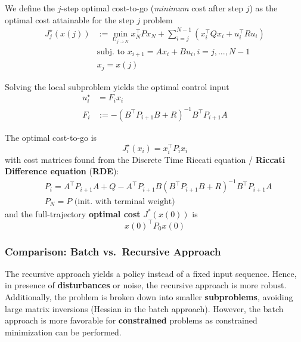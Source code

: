 We define the $j$-step optimal cost-to-go (\textit{minimum} cost after step $j$) as the optimal cost attainable for the step $j$ problem
\noindent\begin{align*}
    J_j^\star(x(j)) & :=\min_{U_{j\to N}}x_N^\top Px_N+\sum_{i=j}^{N-1}(x_i^\top Qx_i+u_i^\top Ru_i) \\
                    & \text{subj.\ to }x_{i+1}=Ax_i+Bu_i,i=j,...,N-1                                 \\
                    & x_j=x(j)
\end{align*}

\newpar{}

Solving the local subproblem yields the optimal control input
\noindent\begin{align*}
    u_{i}^{\star} & =F_{i} x_{i}                                   \\
    F_{i}         & :=-{(B^\top P_{i+1} B+R)}^{-1}B^\top P_{i+1} A
\end{align*}

The optimal cost-to-go is
\noindent\begin{equation*}
    J_{i}^{\star}(x_{i})  = x_{i}^{\top}P_{i}x_{i}
\end{equation*}
with cost matrices found from the Discrete Time Riccati equation / \textbf{Riccati Difference equation} (\textbf{RDE}):
\noindent\begin{align*}
     & P_{i} = A^\top P_{i+1} A+Q-A^\top P_{i+1} B{(B^\top P_{i+1} B+R)}^{-1}B^\top P_{i+1} A \\
     & P_{N} = P \text{ (init.\ with terminal weight)}
\end{align*}
and the full-trajectory \textbf{optimal cost} $J^*(x(0))$ is
\noindent\begin{equation*}
    {x(0)}^\top P_0 x(0)
\end{equation*}

\subsubsection{Comparison: Batch vs.\ Recursive Approach}

The recursive approach yields a policy instead of a fixed input sequence. Hence, in presence of \textbf{disturbances} or noise, the recursive approach is more robust. Additionally, the problem is broken down into smaller \textbf{subproblems}, avoiding large matrix inversions (Hessian in the batch approach). However, the batch approach is more favorable for \textbf{constrained} problems as constrained minimization can be performed.

